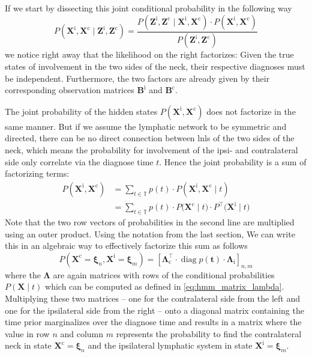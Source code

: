 \documentclass[\relativeRoot/main.tex]{subfiles}
\begin{document}
If we start by dissecting this joint conditional probability in the following way
%
\begin{equation} \label{eq:hmm_bilateral_bayes}
    P \left( \mathbf{X}^\text{i}, \mathbf{X}^\text{c} \mid \mathbf{Z}^\text{i}, \mathbf{Z}^\text{c} \right) = \frac{P \left( \mathbf{Z}^\text{i}, \mathbf{Z}^\text{c} \mid \mathbf{X}^\text{i}, \mathbf{X}^\text{c} \right) \cdot P \left( \mathbf{X}^\text{i}, \mathbf{X}^\text{c} \right)}{P \left( \mathbf{Z}^\text{i}, \mathbf{Z}^\text{c} \right)}
\end{equation}
%
we notice right away that the likelihood on the right factorizes: Given the true states of involvement in the two sides of the neck, their respective diagnoses must be independent. Furthermore, the two factors are already given by their corresponding observation matrices $\mathbf{B}^\text{i}$ and $\mathbf{B}^\text{c}$.

The joint probability of the hidden states $P \left( \mathbf{X}^\text{i}, \mathbf{X}^\text{c} \right)$ does not factorize in the same manner. But if we assume the lymphatic network to be symmetric and directed, there can be no direct connection between \glspl{lnl} of the two sides of the neck, which means the probability for involvement of the ipsi- and contralateral side only correlate via the diagnose time $t$. Hence the joint probability is a sum of factorizing terms:
%
\begin{equation} \label{eq:hmm_bilateral_dissect}
    \begin{aligned}
        P \left( \mathbf{X}^\text{i}, \mathbf{X}^\text{c} \right) &= \sum_{t \in \mathbb{T}}{ p(t) \cdot P \left( \mathbf{X}^\text{i}, \mathbf{X}^\text{c} \mid t \right)} \\
        &= \sum_{t \in \mathbb{T}}{ p(t) \cdot P \big( \mathbf{X}^\text{c} \mid t \big) \cdot P^\top \big( \mathbf{X}^\text{i} \mid t \big)}
    \end{aligned}
\end{equation}
%
Note that the two row vectors of probabilities in the second line are multiplied using an outer product. Using the notation from the last section, We can write this in an algebraic way to effectively factorize this sum as follows
%
\begin{equation} \label{eq:hmm_bilateral_algebra}
    P \left( \mathbf{X}^\text{c} = \boldsymbol{\xi}_n, \mathbf{X}^\text{i} = \boldsymbol{\xi}_m \right) = \left[ \boldsymbol{\Lambda}_\text{c}^\top \cdot \operatorname{diag}{p(\mathbf{t})} \cdot \boldsymbol{\Lambda}_\text{i} \right]_{n,m}
\end{equation}
%
where the $\boldsymbol{\Lambda}$ are again matrices with rows of the conditional probabilities $P \left( \mathbf{X} \mid t \right)$ which can be computed as defined in \cref{eq:hmm_matrix_lambda}. Multiplying these two matrices -- one for the contralateral side from the left and one for the ipsilateral side from the right -- onto a diagonal matrix containing the time prior marginalizes over the diagnose time and results in a matrix where the value in row $n$ and column $m$ represents the probability to find the contralateral neck in state $\mathbf{X}^\text{c} = \boldsymbol{\xi}_n$ and the ipsilateral lymphatic system in state $\mathbf{X}^\text{i} = \boldsymbol{\xi}_m$.
\end{document}
